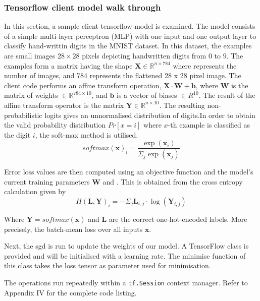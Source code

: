 \subsubsection{Tensorflow client model walk through}\label{sec_c3_tfw}
In this section, a sample client tensorflow model is examined. The model consists of a simple multi-layer perceptron (MLP) with one input and one output layer to classify hand-writtin digits in the MNIST\citep{krizhevsky2012imagenet} dataset.   In this dataset, the examples are small images $28 \times 28$ pixels depicting handwritten digits from $0$ to $9$.  The examples form a matrix having the shape $\mathbf{X}\in\mathbb{R}^{n\times 784}$ where  represents the number of images, and 784 represents the flattened 28 x 28 pixel image.  The client code performs an affine transform operation, $\mathbf{X\cdot W+b}$, where $\mathbf{W}$ is the matrix of weights $\in \mathbb{R}^{784 \times 10}$, and $\mathbf{b}$ is a vector of biases  $\in R^{10}$.  The result of the affine transform operator is the matrix $\mathbf{Y}\in \mathbb{R}^{n\times 10}$. The resulting non-probabilistic logits gives an unnormalised distribution of digits.In order to obtain the valid probability distribution $Pr[x=i]$ where $x$-th example is classified as the digit $i$, the soft-max method is utilised. 
\begin{equation}
softmax(\mathbf{x})_i=\frac{\exp(\mathbf{x}_i)}{\Sigma_j\exp(\mathbf{x}_j)}\label{eqn_c3_smax00}
\end{equation} 

Error loss values are then computed using an objective function and the model’s current training parameters $\mathbf{W}$ and .  This is obtained from the cross entropy calculation given by
\begin{equation}
    H(\mathbf{L,Y})_i=−\Sigma_j\mathbf{L}_{i,j}\cdot\log(\mathbf{Y}_{i,j})
\end{equation}

Where $\mathbf{Y}=softmax(\mathbf{x})$ and $\mathbf{L}$ are the correct one-hot-encoded labels.  More precisely, the batch-mean loss over all inputs $\mathbf{x}$.


Next, the \acrfull{sgd} is run to update the weights of our model.  A TensorFlow class is provided and will be initialised with a learning rate.  The minimise function of this class takes the loss tensor as parameter used for minimisation.

The operations run repeatedly within a \texttt{tf.Session} context manager. Refer to Appendix IV for the complete code listing.

